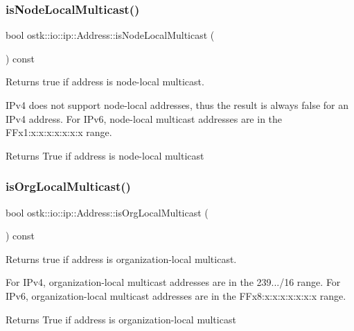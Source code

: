 \subsubsection{\texorpdfstring{is\+Node\+Local\+Multicast()}{isNodeLocalMulticast()}}
{\footnotesize\ttfamily bool ostk\+::io\+::ip\+::\+Address\+::is\+Node\+Local\+Multicast (\begin{DoxyParamCaption}{ }\end{DoxyParamCaption}) const}



Returns true if address is node-\/local multicast. 

I\+Pv4 does not support node-\/local addresses, thus the result is always false for an I\+Pv4 address. For I\+Pv6, node-\/local multicast addresses are in the F\+Fx1\+:x\+:x\+:x\+:x\+:x\+:x\+:x range.

\begin{DoxyReturn}{Returns}
True if address is node-\/local multicast 
\end{DoxyReturn}
\mbox{\label{classostk_1_1io_1_1ip_1_1_address_afcee80f65426fbe4118df48e13f3b3f9}} 
\subsubsection{\texorpdfstring{is\+Org\+Local\+Multicast()}{isOrgLocalMulticast()}}
{\footnotesize\ttfamily bool ostk\+::io\+::ip\+::\+Address\+::is\+Org\+Local\+Multicast (\begin{DoxyParamCaption}{ }\end{DoxyParamCaption}) const}



Returns true if address is organization-\/local multicast. 

For I\+Pv4, organization-\/local multicast addresses are in the 239.../16 range. For I\+Pv6, organization-\/local multicast addresses are in the F\+Fx8\+:x\+:x\+:x\+:x\+:x\+:x\+:x range.

\begin{DoxyReturn}{Returns}
True if address is organization-\/local multicast 
\end{DoxyReturn}
\mbox{\label{classostk_1_1io_1_1ip_1_1_address_a45d624593229bcba43e0724cd4a06c1f}} 
